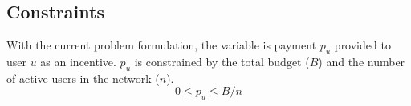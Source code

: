 \documentclass[times, 10pt,twocolumn]{article}
\begin{document}
\subsection{Constraints}
With the current problem formulation, the variable is payment $p_u$ provided to user $u$ as an incentive. $p_u$ is constrained by the total budget ($B$) and the number of active users in the network ($n$).
\begin{equation}
0 \leq p_u \leq B/n
\end{equation}

\end{document}

